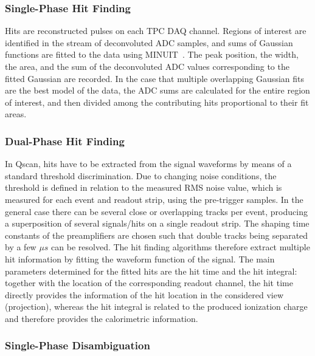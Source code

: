 \subsubsection{Single-Phase Hit Finding}

Hits are reconstructed pulses on each TPC DAQ channel.  Regions of
interest are identified in the stream of deconvoluted ADC samples, and
sums of Gaussian functions are fitted to the data using
MINUIT~\cite{James:1994vla}.  The peak position, the width, the area, and the
sum of the deconvoluted ADC values corresponding to the fitted
Gaussian are recorded.  In the case that multiple overlapping Gaussian
fits are the best model of the data, the ADC sums are calculated for
the entire region of interest, and then divided among the contributing
hits proportional to their fit areas.  



\subsubsection{Dual-Phase Hit Finding}

In Qscan, hits have to be extracted from the signal waveforms by means of a standard threshold discrimination. 
Due to changing noise conditions, the threshold is defined in relation to the measured RMS noise value, 
which is measured for each event and readout strip, using the pre-trigger samples.
In the general case there can be several close or overlapping tracks per event, producing a superposition of several signals/hits on a single readout strip. 
The shaping time constants of the preamplifiers are chosen such that double tracks being separated by a few $\mu s$ can be resolved.
The hit finding algorithms therefore extract multiple hit information by fitting the waveform function of the signal.
The main parameters determined for the fitted hits are the hit time and the hit integral: 
together with the location of the corresponding readout channel, the hit time directly provides the information of the hit location in the considered view (projection), whereas the hit integral is related to the produced ionization charge and therefore provides the calorimetric information.


\subsubsection{Single-Phase Disambiguation}

